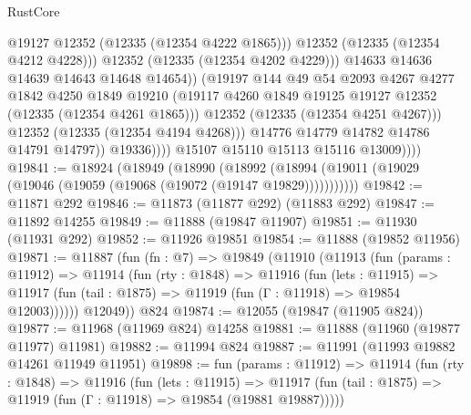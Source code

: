 \begin{lexlean}{RustCore}
\begin{coremodule}
                                    @19127
                                    @12352
                                    (@12335 (@12354 @4222 @1865)))
                                  @12352
                                  (@12335 (@12354 @4212 @4228)))
                                @12352
                                (@12335 (@12354 @4202 @4229)))
                              @14633
                              @14636
                              @14639
                              @14643
                              @14648
                              @14654))
                          (@19197
                            @144
                            @49
                            @54
                            @2093
                            @4267
                            @4277
                            @1842
                            @4250
                            @1849
                            @19210
                            (@19117 @4260 @1849 @19125 @19127 @12352 (@12335 (@12354 @4261 @1865)))
                            @12352
                            (@12335 (@12354 @4251 @4267)))
                          @12352
                          (@12335 (@12354 @4194 @4268)))
                        @14776
                        @14779
                        @14782
                        @14786
                        @14791
                        @14797))
                    @19336))))
            @15107
            @15110
            @15113
            @15116
            @13009))))
@19841 := @18924
    (@18949
      (@18990
        (@18992 (@18994 (@19011 (@19029 (@19046 (@19059 (@19068 (@19072 (@19147 @19829)))))))))))
@19842 := @11871 @292
@19846 := @11873 (@11877 @292) (@11883 @292)
@19847 := @11892 @14255
@19849 := @11888 (@19847 @11907)
@19851 := @11930 (@11931 @292)
@19852 := @11926 @19851
@19854 := @11888 (@19852 @11956)
@19871 := @11887
    (fun (fn : @7) =>
    @19849
      (@11910
        (@11913
          (fun (params : @11912) =>
          @11914
            (fun (rty : @1848) =>
            @11916
              (fun (lets : @11915) =>
              @11917 (fun (tail : @1875) => @11919 (fun (Γ : @11918) => @19854 @12003))))))
        @12049))
    @824
@19874 := @12055 (@19847 (@11905 @824))
@19877 := @11968 (@11969 @824) @14258
@19881 := @11888 (@11960 (@19877 @11977) @11981)
@19882 := @11994 @824
@19887 := @11991 (@11993 @19882 @14261 @11949 @11951)
@19898 := fun (params : @11912) =>
  @11914
    (fun (rty : @1848) =>
    @11916
      (fun (lets : @11915) =>
      @11917 (fun (tail : @1875) => @11919 (fun (Γ : @11918) => @19854 (@19881 @19887)))))

\end{coremodule}
\end{lexlean}
